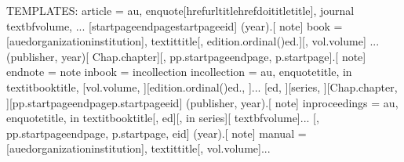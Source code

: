 \documentclass[letterpaper,10pt,english]{sphinxmanual}
\begin{document}
%
\begin{sphinxVerbatim}[commandchars=\\\{\}]
TEMPLATES:
article = \PYGZlt{}au\PYGZgt{}, \PYGZbs{}enquote\PYGZob{}[\PYGZbs{}href\PYGZob{}\PYGZlt{}url\PYGZgt{}\PYGZcb{}\PYGZob{}\PYGZlt{}title\PYGZgt{}\PYGZcb{}\textbar{}\PYGZbs{}href\PYGZob{}\PYGZlt{}doi\PYGZgt{}\PYGZcb{}\PYGZob{}\PYGZlt{}title\PYGZgt{}\PYGZcb{}\textbar{}\PYGZlt{}title\PYGZgt{}],\PYGZcb{} \PYGZlt{}journal\PYGZgt{} \PYGZbs{}textbf\PYGZob{}\PYGZlt{}volume\PYGZgt{}\PYGZcb{},\PYGZob{} \PYGZcb{}...
        [\PYGZlt{}startpage\PYGZgt{}\PYGZhy{}\PYGZhy{}\PYGZlt{}endpage\PYGZgt{}\textbar{}\PYGZlt{}startpage\PYGZgt{}\textbar{}\PYGZlt{}eid\PYGZgt{}\textbar{}] (\PYGZlt{}year\PYGZgt{}).[ \PYGZlt{}note\PYGZgt{}]
book = [\PYGZlt{}au\PYGZgt{}\textbar{}\PYGZlt{}ed\PYGZgt{}\textbar{}\PYGZlt{}organization\PYGZgt{}\textbar{}\PYGZlt{}institution\PYGZgt{}\textbar{}], \PYGZbs{}textit\PYGZob{}\PYGZlt{}title\PYGZgt{}\PYGZcb{}[, \PYGZlt{}edition.ordinal()\PYGZgt{}\PYGZti{}ed.][, vol.\PYGZti{}\PYGZlt{}volume\PYGZgt{}]\PYGZob{} \PYGZcb{}...
        (\PYGZlt{}publisher\PYGZgt{}, \PYGZlt{}year\PYGZgt{})[ Chap.\PYGZti{}\PYGZlt{}chapter\PYGZgt{}][, pp.\PYGZti{}\PYGZlt{}startpage\PYGZgt{}\PYGZhy{}\PYGZhy{}\PYGZlt{}endpage\PYGZgt{}\textbar{}, p.\PYGZti{}\PYGZlt{}startpage\PYGZgt{}].[ \PYGZlt{}note\PYGZgt{}]
endnote = \PYGZlt{}note\PYGZgt{}
inbook = incollection
incollection = \PYGZlt{}au\PYGZgt{}, \PYGZbs{}enquote\PYGZob{}\PYGZlt{}title\PYGZgt{},\PYGZcb{} in \PYGZbs{}textit\PYGZob{}\PYGZlt{}booktitle\PYGZgt{}\PYGZcb{}, [vol.\PYGZti{}\PYGZlt{}volume\PYGZgt{}, ][\PYGZlt{}edition.ordinal()\PYGZgt{}\PYGZti{}ed., ]...
        [\PYGZlt{}ed\PYGZgt{}, ][\PYGZlt{}series\PYGZgt{}, ][Chap.\PYGZti{}\PYGZlt{}chapter\PYGZgt{}, ][pp.\PYGZti{}\PYGZlt{}startpage\PYGZgt{}\PYGZhy{}\PYGZhy{}\PYGZlt{}endpage\PYGZgt{}\textbar{}p.\PYGZti{}\PYGZlt{}startpage\PYGZgt{}\textbar{}\PYGZlt{}eid\PYGZgt{}\textbar{}] (\PYGZlt{}publisher\PYGZgt{}, \PYGZlt{}year\PYGZgt{}).[ \PYGZlt{}note\PYGZgt{}]
inproceedings = \PYGZlt{}au\PYGZgt{}, \PYGZbs{}enquote\PYGZob{}\PYGZlt{}title\PYGZgt{},\PYGZcb{} in \PYGZbs{}textit\PYGZob{}\PYGZlt{}booktitle\PYGZgt{}\PYGZcb{}[, \PYGZlt{}ed\PYGZgt{}][, in \PYGZlt{}series\PYGZgt{}][ \PYGZbs{}textbf\PYGZob{}\PYGZlt{}volume\PYGZgt{}\PYGZcb{}]...
        [, pp.\PYGZti{}\PYGZlt{}startpage\PYGZgt{}\PYGZhy{}\PYGZhy{}\PYGZlt{}endpage\PYGZgt{}\textbar{}, p.\PYGZti{}\PYGZlt{}startpage\PYGZgt{}\textbar{}, \PYGZlt{}eid\PYGZgt{}] (\PYGZlt{}year\PYGZgt{}).[ \PYGZlt{}note\PYGZgt{}]
manual = [\PYGZlt{}au\PYGZgt{}\textbar{}\PYGZlt{}ed\PYGZgt{}\textbar{}\PYGZlt{}organization\PYGZgt{}\textbar{}\PYGZlt{}institution\PYGZgt{}\textbar{}], \PYGZbs{}textit\PYGZob{}\PYGZlt{}title\PYGZgt{}\PYGZcb{}[, vol.\PYGZti{}\PYGZlt{}volume\PYGZgt{}]...

\end{sphinxVerbatim}
\end{document}
